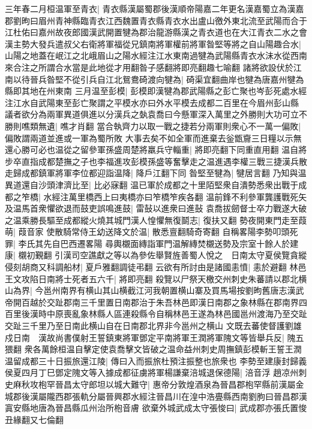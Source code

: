 三年春二月桓温軍至青衣|{
	青衣縣漢屬蜀郡後漢順帝陽嘉二年更名漢嘉蜀立為漢嘉郡劉昫曰眉州青神縣臨青衣江西魏置青衣縣青衣水出盧山徼外東北流至武陽而合于江杜佑曰嘉州故夜郎國漢武開置犍為郡治龍游縣漢之青衣道也在大江青衣二水之會}
漢主勢大發兵遣叔父右衛將軍福從兄鎮南將軍權前將軍昝堅等將之自山陽趣合水|{
	山陽之地蓋在岷江之北峨眉山之陽水經注江水東南過犍為武陽縣青衣水沬水從西南來合注之所謂合水當是此地從才用翻昝子感翻將即亮翻趣七喻翻}
諸將欲設伏於江南以待晉兵昝堅不從引兵自江北鴛鴦碕渡向犍為|{
	碕渠宜翻曲岸也犍為唐嘉州犍為縣即其地在州東南}
三月温至彭模|{
	彭模即漢犍為郡武陽縣之彭亡聚也岑彭死處水經注江水自武陽東至彭亡聚謂之平模水亦曰外水平模去成都二百里在今眉州彭山縣}
議者欲分為兩軍異道俱進以分漢兵之埶袁喬曰今懸軍深入萬里之外勝則大功可立不勝則噍類無遺|{
	噍才肖翻}
當合執齊力以取一戰之捷若分兩軍則衆心不一萬一偏敗|{
	偏敗謂兩道並進或一軍為蜀所敗}
大事去矣不如全軍而進棄去釡甑齎三日糧以示無還心勝可必也温從之留參軍孫盛周楚將羸兵守輜重|{
	將即亮翻下同重直用翻}
温自將步卒直指成都楚撫之子也李福進攻彭模孫盛等奮擊走之温進遇李權三戰三捷漢兵散走歸成都鎮軍將軍李位都迎詣温降|{
	降戶江翻下同}
昝堅至犍為|{
	犍居言翻}
乃知與温異道還自沙頭津濟比至|{
	比必寐翻}
温已軍於成都之十里陌堅衆自潰勢悉衆出戰于成都之笮橋|{
	水經注萬里橋西上曰夷橋亦曰笮橋笮疾各翻}
温前鋒不利參軍龔護戰死矢及温馬首衆懼欲退而鼓吏誤鳴進鼓|{
	雷鼔以進衆曰進鼔}
袁喬拔劒督士卒力戰遂大破之温乘勝長驅至成都縱火燒其城門漢人惶懼無復鬬志|{
	復扶又翻}
勢夜開東門走至葭萌|{
	葭音家}
使散騎常侍王幼送降文於温|{
	散悉亶翻騎奇寄翻}
自稱畧陽李勢叩頭死罪|{
	李氏其先自巴西遷畧陽}
尋輿櫬面縳詣軍門温解縳焚櫬送勢及宗室十餘人於建康|{
	櫬初覲翻}
引漢司空譙獻之等以為參佐舉賢旌善蜀人悅之　日南太守夏侯覽貪縱侵刻胡商又科調船材|{
	夏戶雅翻調徒弔翻}
云欲有所討由是諸國恚憤|{
	恚於避翻}
林邑王文攻陷日南將士死者五六千|{
	將即亮翻}
殺覽以尸祭天檄交州刺史朱蕃請以郡北横山為界|{
	今邕州南界有横山其山横截江河我朝置横山寨及買馬場按劉昫舊唐志漢武帝開百越於交趾郡南三千里置日南郡治于朱吾林邑即漢日南郡之象林縣在郡南界四百里後漢時中原喪亂象林縣人區連殺縣令自稱林邑王遂為林邑國邕州渡海乃至交趾交趾三千里乃至日南此横山自在日南郡北界非今邕州之横山}
文既去蕃使督護劉雄戍日南　漢故尚書僕射王誓鎮東將軍鄧定平南將軍王潤將軍隗文等皆舉兵反|{
	隗五猥翻}
衆各萬餘桓温自擊定使袁喬擊文皆破之温命益州刺史周撫鎮彭模斬王誓王潤温留成都三十日振旅還江陵|{
	傳曰入而振旅杜預注振整也旅衆也}
李勢至建康封歸義侯夏四月丁巳鄧定隗文等入據成都征虜將軍楊謙棄涪城退保德陽|{
	涪音浮}
趙凉州刺史麻秋攻枹罕晉昌太守郎坦以城大難守|{
	惠帝分敦煌酒泉為晉昌郡枹罕縣前漢屬金城郡後漢屬隴西郡張軌分屬晉興郡水經注晉昌川在湟中浩亹縣西南劉朐曰晉昌郡漢寘安縣地唐為晉昌縣瓜州治所枹音膚}
欲棄外城武成太守張悛曰|{
	武成郡亦張氏置悛丑緣翻又七倫翻}

